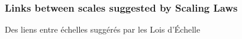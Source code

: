 


\subsubsection{Links between scales suggested by Scaling Laws}{Des liens entre échelles suggérés par les Lois d'Échelle}





